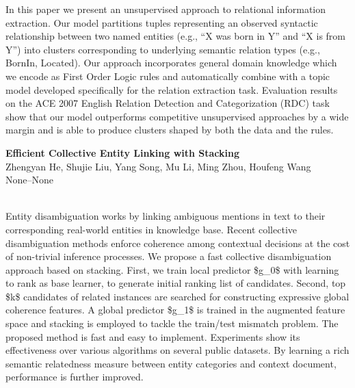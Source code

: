 \documentclass[twoside,makeidx]{book}
\renewcommand{\normalsize}{\fontsize{8}{9}\selectfont}
\renewcommand{\small}{\fontsize{7}{8}\selectfont}
\begin{document}
\nopagebreak%
\noindent%
{\small In this paper we present an unsupervised approach to relational information extraction. Our model partitions tuples representing an observed syntactic relationship between two named entities (e.g., ``X was born in Y'' and ``X is from Y'') into clusters corresponding to underlying semantic relation types (e.g., BornIn, Located). Our approach incorporates general domain knowledge which we encode as First Order Logic rules and automatically combine with a topic model developed specifically for the relation extraction task. Evaluation results on the ACE 2007 English Relation Detection and Categorization (RDC) task show that our model outperforms competitive unsupervised approaches by a wide margin and is able to produce clusters shaped by both the data and the rules.}
\par\vspace{2em}\noindent%
\begin{minipage}{\linewidth}%
\begin{center}
\textbf{\normalsize Efficient Collective Entity Linking with Stacking}\\
\normalsize  Zhengyan He,  Shujie Liu,  Yang Song,  Mu Li,  Ming Zhou,  Houfeng Wang\\
{\small None--None}\\
\end{center}
\end{minipage}\\[0.5em]
\nopagebreak%
\noindent%
{\small Entity disambiguation works by linking ambiguous mentions in text to their   corresponding real-world entities in knowledge base. Recent collective   disambiguation methods enforce coherence among contextual decisions at the   cost of non-trivial inference processes. We propose a fast collective   disambiguation approach based on stacking. First, we train local predictor   \$g\_0\$ with learning to rank as base learner, to generate initial ranking list   of candidates. Second, top \$k\$ candidates of related instances are searched   for constructing expressive global coherence features. A global predictor   \$g\_1\$ is trained in the augmented feature space and stacking is employed to   tackle the train/test mismatch problem.   The proposed method is fast and easy to implement. Experiments show its   effectiveness over various algorithms on several public datasets. By learning   a rich semantic relatedness measure between entity categories and context   document, performance is further improved.}
\par\vspace{2em}\noindent%
\end{document}
